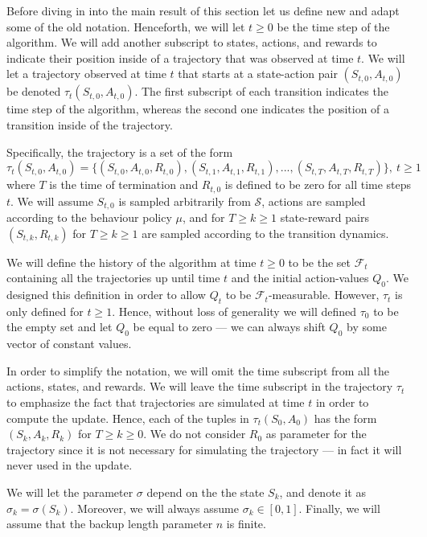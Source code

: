 Before diving in into the main result of this section let us define new and adapt some of the old notation.
Henceforth, we will let $t \geq 0$ be the time step of the algorithm.
We will add another subscript to states, actions, and rewards to indicate their position inside of a trajectory that was observed at time $t$.
We will let a trajectory observed at time $t$ that starts at a state-action pair $(S_{t,0}, A_{t,0})$ be denoted $\tau_{t} (S_{t,0}, A_{t,0})$.
The first subscript of each transition indicates the time step of the algorithm, whereas the second one indicates the position of a transition inside of the trajectory.

Specifically, the trajectory is a set of the form
%
\begin{equation}
\label{eq:trajectory}
\tau_t(S_{t,0}, A_{t,0}) = \{(S_{t,0}, A_{t,0}, R_{t,0}), (S_{t,1}, A_{t,1}, R_{t,1}), ..., (S_{t,T}, A_{t, T}, R_{t, T}) \}, \ t \geq 1
\end{equation}
%
where $T$ is the time of termination and $R_{t,0}$ is defined to be zero for all time steps $t$.
We will assume $S_{t,0}$ is sampled arbitrarily from $\mathcal{S}$, actions are sampled according to the behaviour policy $\mu$, and for $T \geq k \geq 1$ state-reward pairs $(S_{t,k}, R_{t,k})$ for $T \geq k \geq 1$ are sampled according to the transition dynamics.

We will define the history of the algorithm at time $t \geq 0$ to be the set $\mathcal{F}_t$ containing all the trajectories up until time $t$ and the initial action-values $Q_0$.
We designed this definition in order to allow $Q_t$ to be $\mathcal{F}_t$-measurable.
However, $\tau_t$ is only defined for $t \geq 1$.
Hence, without loss of generality we will defined $\tau_0$ to be the empty set and let $Q_0$ be equal to zero --- we can always shift $Q_0$ by some vector of constant values.

In order to simplify the notation, we will omit the time subscript from all the actions, states, and rewards.
We will leave the time subscript in the trajectory $\tau_t$ to emphasize the fact that trajectories are simulated at time $t$ in order to compute the update.
Hence, each of the tuples in $\tau_t(S_{0},A_{0})$ has the form $(S_{k}, A_{k}, R_{k})$ for $ T \geq k \geq 0$.
We do not consider $R_{0}$ as parameter for the trajectory since it is not necessary for simulating the trajectory --- in fact it will never used in the update.

We will let the parameter $\sigma$ depend on the the state $S_{k}$, and denote it as $\sigma_{k} = \sigma(S_{k})$.
Moreover, we will always assume $\sigma_k \in [0,1]$.
Finally, we will assume that the backup length parameter $n$ is finite.

